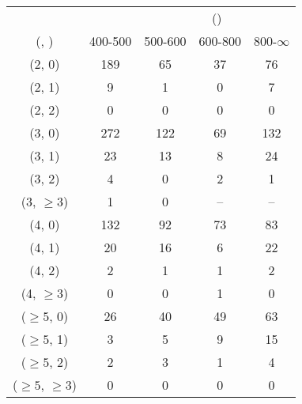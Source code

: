 \begin{table}[h!]
\tiny
\centering
{}
\begin{tabular}
{ccccc}
	\hline\hline
&	& \multicolumn{4}{c}{\scalht (\gev)} \\ 
	 (\njet,  \nb) & 400-500 & 500-600 & 600-800 & 800-$\infty$ \\ [0.8ex] 
\hline
	(2, 0) & 189 & 65 & 37 & 76 \\[0.5ex] 
	(2, 1) & 9 & 1 & 0 & 7 \\[0.5ex] 
	(2, 2) & 0 & 0 & 0 & 0 \\[0.5ex] 
	(3, 0) & 272 & 122 & 69 & 132 \\[0.5ex] 
	(3, 1) & 23 & 13 & 8 & 24 \\[0.5ex] 
	(3, 2) & 4 & 0 & 2 & 1 \\[0.5ex] 
	(3, $\ge3$) & 1 & 0 & -- & -- \\[0.5ex] 
	(4, 0) & 132 & 92 & 73 & 83 \\[0.5ex] 
	(4, 1) & 20 & 16 & 6 & 22 \\[0.5ex] 
	(4, 2) & 2 & 1 & 1 & 2 \\[0.5ex] 
	(4, $\ge3$) & 0 & 0 & 1 & 0 \\[0.5ex] 
	($\ge5$, 0) & 26 & 40 & 49 & 63 \\[0.5ex] 
	($\ge5$, 1) & 3 & 5 & 9 & 15 \\[0.5ex] 
	($\ge5$, 2) & 2 & 3 & 1 & 4 \\[0.5ex] 
	($\ge5$, $\ge3$) & 0 & 0 & 0 & 0 \\[0.5ex] 
	\hline
	\hline
\end{tabular}
\end{table}
